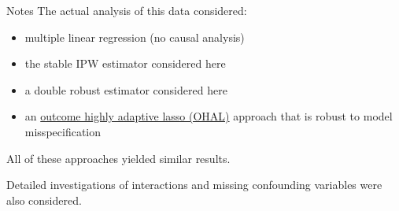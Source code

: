 \documentclass[
  ignorenonframetext,
]{beamer}
\providecommand{\tightlist}{%
  \setlength{\itemsep}{0pt}\setlength{\parskip}{0pt}}
\begin{document}
\begin{frame}{Notes}
\protect\hypertarget{notes}{}
The actual analysis of this data considered:

\begin{itemize}
\tightlist
\item
  multiple linear regression (no causal analysis)
\item
  the stable IPW estimator considered here
\item
  a double robust estimator considered here
\item
  an
  \href{https://onlinelibrary.wiley.com/doi/full/10.1111/biom.13121?casa_token=ddW0avPzm40AAAAA\%3ANIe-rtFH88rz9jwsxFgkyPf8UN2za50rfIXkF5Y1f0VJgt9HH9qYNfQH_ud7kGYlAZzKm2LzImIhjdUw}{outcome
  highly adaptive lasso (OHAL)} approach that is robust to model
  misspecification
\end{itemize}

\vspace{12pt}

All of these approaches yielded similar results.

\vspace{12pt}

Detailed investigations of interactions and missing confounding
variables were also considered.
\end{frame}
\end{document}
